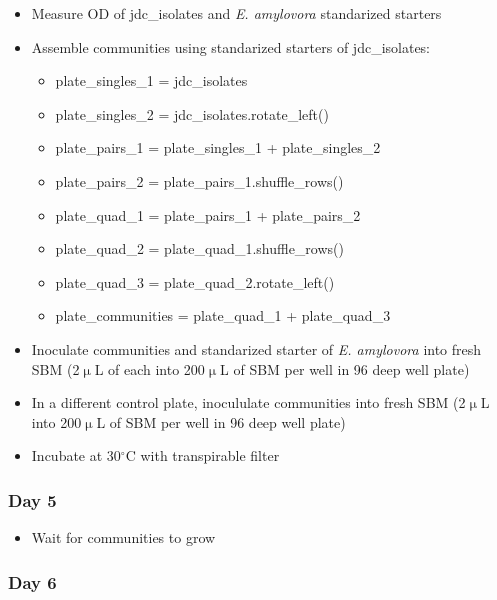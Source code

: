 \documentclass[a4paper,10pt]{article}
\begin{document}
\begin{itemize}[label=\Square]

\item Measure OD of jdc\_isolates and \textit{E. amylovora} standarized starters
\item Assemble communities using standarized starters of jdc\_isolates:
\begin{itemize}[label=\Square]
\item plate\_singles\_1 = jdc\_isolates
\item plate\_singles\_2 = jdc\_isolates.rotate\_left()
\item plate\_pairs\_1 = plate\_singles\_1 + plate\_singles\_2
\item plate\_pairs\_2 = plate\_pairs\_1.shuffle\_rows()
\item plate\_quad\_1 = plate\_pairs\_1 + plate\_pairs\_2
\item plate\_quad\_2 = plate\_quad\_1.shuffle\_rows()
\item plate\_quad\_3 = plate\_quad\_2.rotate\_left()
\item plate\_communities = plate\_quad\_1 + plate\_quad\_3
\end{itemize}
\item Inoculate communities and standarized starter of \textit{E. amylovora}
into fresh SBM (2$\upmu$L of each into 200$\upmu$L of SBM per well in 96 deep
well plate)
\item In a different control plate, inocululate communities 
into fresh SBM (2$\upmu$L into 200$\upmu$L of SBM per well in 96 deep
well plate)
\item Incubate at 30$^\circ$C with transpirable filter

\end{itemize}

\subsubsection*{Day 5}

\begin{itemize}[label=\Square]

\item Wait for communities to grow

\end{itemize}

\subsubsection*{Day 6}
\end{document}
